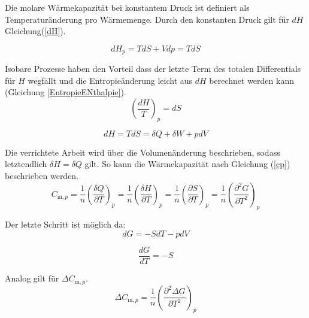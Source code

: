 \documentclass[a4paper,12pt,oneside,onecolum,final,openany]{report}
\begin{document}
Die molare Wärmekapazität bei konstantem Druck ist definiert als Temperaturänderung pro Wärmemenge. Durch den konstanten Druck gilt für $dH$ Gleichung(\ref{dH}). 

\begin{equation} \label{dH}
dH_p= TdS +Vdp =TdS
\end{equation}

Isobare Prozesse haben den Vorteil dass der letzte Term des totalen Differentials für $H$ wegfällt und die Entropieänderung leicht aus $dH$ berechnet werden kann (Gleichung \ref{EntropieENthalpie}).\\


\begin{equation} \label{EntropieEnthalpie}
\left(\frac{dH}{T}\right)_p = dS
\end{equation}

\begin{equation}
dH = TdS = \delta Q + \delta W +pdV
\end{equation}
 
Die verrichtete Arbeit wird über die Volumenänderung beschrieben, sodass letztendlich $\delta H = \delta Q$ gilt. So kann die Wärmekapazität nach Gleichung (\ref{cp}) beschrieben werden.\\

\begin{equation} \label{cp}
C_{\mathrm{m},p} =\frac{1}{n} \left(\frac{\delta Q}{\partial T}\right)_p =\frac{1}{n} \left(\frac{\delta H}{\partial T}\right)_p = \frac{1}{n} \left(\frac{\partial S}{\partial T}\right)_p= \frac{1}{n} \left(\frac{\partial^2 G}{\partial T^2}\right)_p
\end{equation}

Der letzte Schritt ist möglich da:\\

\begin{equation}
dG =-SdT -pdV
\end{equation}

\begin{equation}
\frac{dG}{dT}= -S
\end{equation}

Analog gilt für $\Delta C_{\mathrm{m},p}$.\\

\begin{equation}
\Delta C_{\mathrm{m},p} = \frac{1}{n} \left(\frac{\partial^2 \Delta G}{\partial T^2}\right)_p
\end{equation}
\end{document}
